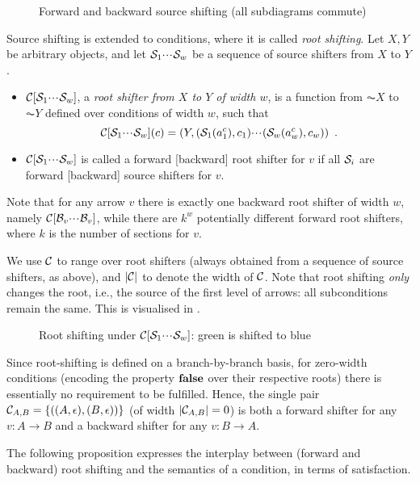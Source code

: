 \begin{figure}
\centering

\caption{Forward and backward source shifting (all subdiagrams commute)}
\end{figure}

Source shifting is extended to conditions, where it is called \emph{root shifting}. Let $X,Y$ be arbitrary objects, and let $\mathcal{S}_1{\cdotp\mkern-2mu\cdotp\mkern-2mu\cdotp\mkern1mu} \mathcal{S}_w$ be a sequence of source shifters from $X$ to $Y$.
%
\begin{itemize}
\item $\mathcal{C}[\mathcal{S}_1{\cdotp\mkern-2mu\cdotp\mkern-2mu\cdotp\mkern1mu} \mathcal{S}_w]$, a \emph{root shifter from $X$ to $Y$ of width $w$}, is a function from $\AC X$ to $\AC Y$ defined over conditions of width $w$, such that 
\[ \mathcal{C}[\mathcal{S}_1{\cdotp\mkern-2mu\cdotp\mkern-2mu\cdotp\mkern1mu} \mathcal{S}_w](c) = (Y,(\mathcal{S}_1(a^c_1),c_1){\cdotp\mkern-2mu\cdotp\mkern-2mu\cdotp\mkern1mu} (\mathcal{S}_w(a^c_w),c_w)) \enspace.
\]
\item $\mathcal{C}[\mathcal{S}_1{\cdotp\mkern-2mu\cdotp\mkern-2mu\cdotp\mkern1mu} \mathcal{S}_w]$ is called a forward [backward] root shifter for $v$ if all $\mathcal{S}_i$ are forward [backward] source shifters for $v$.
\end{itemize}
%
Note that for any arrow $v$ there is exactly one backward root shifter of width $w$, namely $\mathcal{C}[\mathcal{B}_v{\cdotp\mkern-2mu\cdotp\mkern-2mu\cdotp\mkern1mu} \mathcal{B}_v]$, while there are $k^w$ potentially different forward root shifters, where $k$ is the number of sections for $v$.

We use $\mathcal{C}$ to range over root shifters (always obtained from a sequence of source shifters, as above), and $|\mathcal{C}|$ to denote the width of $\mathcal{C}$. Note that root shifting \emph{only} changes the root, i.e., the source of the first level of arrows: all subconditions remain the same. This is visualised in .
%
\begin{figure}
\centering

\caption{Root shifting under $\mathcal{C}[\mathcal{S}_1{\cdotp\mkern-2mu\cdotp\mkern-2mu\cdotp\mkern1mu} \mathcal{S}_w]$: green is shifted to blue}
\end{figure}

Since root-shifting is defined on a branch-by-branch basis, for zero-width conditions (encoding the property $\textbf{false}$ over their respective roots) there is essentially no requirement to be fulfilled. Hence, the single pair $\mathcal{C}_{A,B}=\{{((A,\epsilon),(B,\epsilon))}\}$ (of width $|\mathcal{C}_{A,B}|=0$) is both a forward shifter for any $v:A\to B$ and a backward shifter for any $v:B\to A$.

The following proposition expresses the interplay between (forward and backward) root shifting and the semantics of a condition, in terms of satisfaction.


